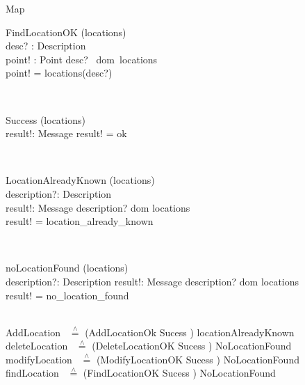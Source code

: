 \documentclass[12pt]{article}
\begin{document}
\begin{spacing}{1.5}
\begin{class}{Map}
\begin{op}{FindLocationOK}
\Xi (locations) \\
desc? : Description\\
point! : Point
\ST
desc? \in ~dom~locations \\
point! = locations(desc?)
\end{op}\\
\begin{op}{Success}
\Xi (locations) \\
result!: Message
\ST
result! = ok
\end{op}\\
\zbreak
\begin{op}{LocationAlreadyKnown}
\Xi (locations) \\
description?: Description \\
result!: Message
\ST
description? \in dom locations \\
result! = location_already_known
\end{op}\\
\begin{op}{noLocationFound}
\Xi (locations) \\
description?: Description
result!: Message
\ST
description? \notin dom locations \\
result! = no_location_found
\end{op}\\
AddLocation ~$\stackrel{\wedge}{=}$ (AddLocationOk \land Sucess ) \lor locationAlreadyKnown
\\
deleteLocation ~$\stackrel{\wedge}{=}$ (DeleteLocationOK \land Sucess ) \lor NoLocationFound
\\
modifyLocation ~$\stackrel{\wedge}{=}$ (ModifyLocationOK \land Sucess ) \lor NoLocationFound
\\
findLocation ~$\stackrel{\wedge}{=}$ (FindLocationOK \land Sucess ) \lor NoLocationFound
\end{class}
\znewpage


\end{spacing}
\end{document}
